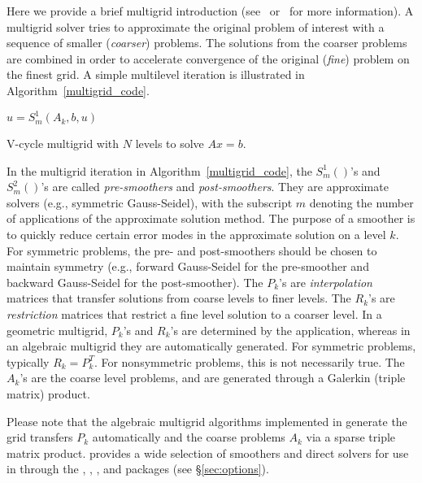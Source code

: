 \label{sec:multigrid intro}
Here we provide a brief multigrid introduction (see~\cite{MGTutorial}
or~\cite{OwlBook} for more information). A multigrid solver tries to approximate
the original problem of interest with a sequence of smaller (\textit{coarser})
problems. The solutions from the coarser problems are combined in order to
accelerate convergence of the original (\textit{fine}) problem on the finest
grid. A simple multilevel iteration is illustrated in
Algorithm~\ref{multigrid_code}.

\begin{algorithm}
\centering
\begin{algorithmic}[0]
    \State $ u = S^{1}_m (A_k, b, u)$
        \State{}
      \EndIf
  \EndFunction
\end{algorithmic}
\caption{V-cycle multigrid with $N$ levels to solve $Ax=b$.}
\label{multigrid_code}
\end{algorithm}

In the multigrid iteration in Algorithm~\ref{multigrid_code}, the $S^{1}_m()$'s
and $S^{2}_m()$'s are called \textit{pre-smoothers} and \textit{post-smoothers}.
They are approximate solvers (e.g., symmetric Gauss-Seidel), with the subscript
$m$ denoting the number of applications of the approximate solution method. The
purpose of a smoother is to quickly reduce certain error modes in the
approximate solution on a level $k$. For symmetric problems, the pre-
and post-smoothers should be chosen to maintain symmetry (e.g., forward
Gauss-Seidel for the pre-smoother and backward Gauss-Seidel for the
post-smoother). The $P_k$'s are \textit{interpolation} matrices that transfer
solutions from coarse levels to finer levels. The $R_k$'s are
\textit{restriction} matrices that restrict a fine level solution to a coarser
level. In a geometric multigrid, $P_k$'s and $R_k$'s are determined
by the application, whereas in an algebraic multigrid they are automatically
generated. For symmetric problems, typically $R_k=P_k^T$. For nonsymmetric
problems, this is not necessarily true. The $A_k$'s are the coarse level
problems, and are generated through a Galerkin (triple matrix) product.

Please note that the algebraic multigrid algorithms implemented in \muelu{}
generate the grid transfers $P_k$ automatically and the coarse problems $A_k$
via a sparse triple matrix product. \trilinos{} provides a wide selection of
smoothers and direct solvers for use in \muelu through the \ifpack,
\ifpacktwo, \amesos, and \amesostwo packages (see \S\ref{sec:options}).
